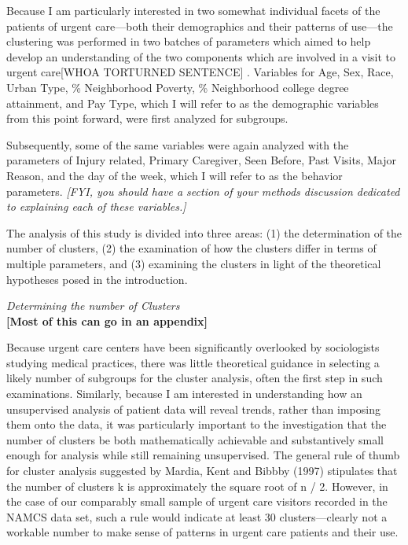 \documentclass[12pt,twoside]{reedthesis}
\begin{document}
  Because I am particularly interested in two somewhat individual facets
  of the patients of urgent care---both their demographics and their
  patterns of use---the clustering was performed in two batches of
  parameters which aimed to help develop an understanding of the two
  components which are involved in a visit to urgent care{[}WHOA TORTURNED
  SENTENCE{]} . Variables for Age, Sex, Race, Urban Type, \% Neighborhood
  Poverty, \% Neighborhood college degree attainment, and Pay Type, which
  I will refer to as the demographic variables from this point forward,
  were first analyzed for subgroups.
  
  Subsequently, some of the same variables were again analyzed with the
  parameters of Injury related, Primary Caregiver, Seen Before, Past
  Visits, Major Reason, and the day of the week, which I will refer to as
  the behavior parameters. \emph{{[}FYI, you should have a section of your
  methods discussion dedicated to explaining each of these variables.{]}}
  
  The analysis of this study is divided into three areas: (1) the
  determination of the number of clusters, (2) the examination of how the
  clusters differ in terms of multiple parameters, and (3) examining the
  clusters in light of the theoretical hypotheses posed in the
  introduction.
  
  \emph{Determining the number of Clusters}\\
  \textbf{{[}Most of this can go in an appendix{]}}
  
  Because urgent care centers have been significantly overlooked by
  sociologists studying medical practices, there was little theoretical
  guidance in selecting a likely number of subgroups for the cluster
  analysis, often the first step in such examinations. Similarly, because
  I am interested in understanding how an unsupervised analysis of patient
  data will reveal trends, rather than imposing them onto the data, it was
  particularly important to the investigation that the number of clusters
  be both mathematically achievable and substantively small enough for
  analysis while still remaining unsupervised. The general rule of thumb
  for cluster analysis suggested by Mardia, Kent and Bibbby (1997)
  stipulates that the number of clusters k is approximately the square
  root of n / 2. However, in the case of our comparably small sample of
  urgent care visitors recorded in the NAMCS data set, such a rule would
  indicate at least 30 clusters---clearly not a workable number to make
  sense of patterns in urgent care patients and their use.
  
\end{document}
